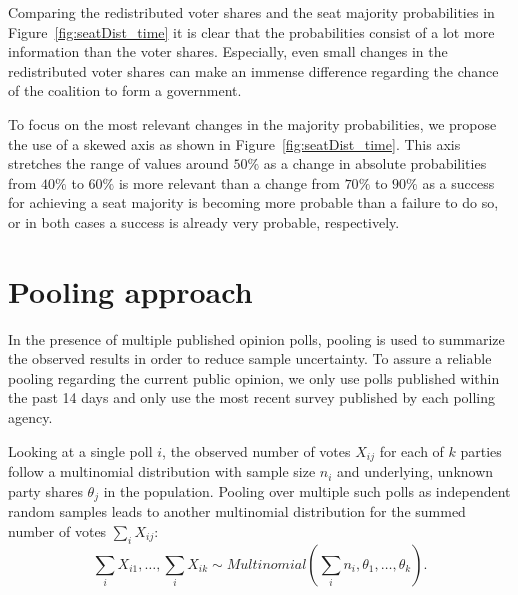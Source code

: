 \documentclass[smallcondensed]{svjour3}     %
\begin{document}
Comparing the redistributed voter shares and the seat majority probabilities
in Figure~\ref{fig:seatDist_time} it is clear that the probabilities consist
of a lot more information than the voter shares. Especially, even small changes
in the redistributed voter shares can make an immense difference regarding the
chance of the coalition to form a government.

To focus on the most relevant changes in the majority probabilities, we propose
the use of a skewed axis as shown in Figure~\ref{fig:seatDist_time}. This axis
stretches the range of values around $50\%$ as a change in absolute probabilities
from $40\%$ to $60\%$ is more relevant than a change from $70\%$ to $90\%$ as
a success for achieving a seat majority is becoming more probable than a failure
to do so, or in both cases a success is already very probable, respectively.



\section{Pooling approach} \label{sec:pooling}
In the presence of multiple published opinion polls, pooling is used to
summarize the observed results in order to reduce sample uncertainty.
To assure a reliable pooling regarding the current public opinion,
we only use polls published within the past 14 days and only use the
most recent survey published by each polling agency.

Looking at a single poll $i$, the observed number of votes $X_{ij}$ for each of $k$ parties follow a multinomial distribution with sample size $n_i$ and underlying, unknown party shares $\theta_j$ in the population.
Pooling over multiple such polls as independent random samples leads to another multinomial distribution for the summed number of votes $\sum_i X_{ij}$:
\begin{equation}
\sum\limits_i X_{i1},\ldots, \sum\limits_i X_{ik} \sim Multinomial \left( \sum\limits_i n_i,\theta_1,\ldots,\theta_k \right).
\end{equation}
\end{document}
